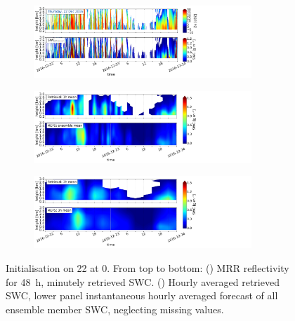 \begin{figure}[H]
	\centering
	\begin{subfigure}[t]{\textwidth}
		\centering
		\includegraphics[trim={0.cm 2.2cm 19.cm 0.5cm},clip,width=0.9\textwidth]{./fig_obs_ret/20161222}
		\caption{}\label{fig:SWC:ret_22}
	\end{subfigure}
	\begin{subfigure}[t]{\textwidth}
		\centering
		\includegraphics[trim={0.cm 2.2cm 19.cm 0.5cm},clip,width=0.9\textwidth]{./fig_vert_SWC_EM/20161222}
		\caption{}\label{fig:SWC_EM:22}
	\end{subfigure}
	\begin{subfigure}[t]{\textwidth}
		\centering
		\includegraphics[trim={0.cm 0.8cm 19.cm 0.5cm},clip,width=0.9\textwidth]{./fig_vert_SWC_3h/20161222}
		\caption{}\label{fig:SWC3h:22}
	\end{subfigure}
	\caption{Initialisation on \SI{22}{\dec} %
		at \SI{0}{\UTC}. From top to bottom: (\protect{}) MRR reflectivity for \SI{48}{\hour}, minutely retrieved SWC.
		(\protect{}) Hourly averaged retrieved SWC, lower panel instantaneous hourly averaged forecast of all ensemble member SWC, neglecting missing values.  
}
\end{figure}

